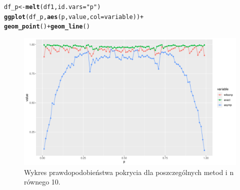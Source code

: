 \documentclass[12pt]{mwart}\usepackage[]{graphicx}\usepackage[]{color}
\makeatletter
\def\maxwidth{ %
  \ifdim\Gin@nat@width>\linewidth
    \linewidth
  \else
    \Gin@nat@width
  \fi
}
\newcommand{\hlstr}[1]{\textcolor[rgb]{0.192,0.494,0.8}{#1}}%
\newcommand{\hlopt}[1]{\textcolor[rgb]{0,0,0}{#1}}%
\newcommand{\hlstd}[1]{\textcolor[rgb]{0.345,0.345,0.345}{#1}}%
\newcommand{\hlkwb}[1]{\textcolor[rgb]{0.69,0.353,0.396}{#1}}%
\newcommand{\hlkwc}[1]{\textcolor[rgb]{0.333,0.667,0.333}{#1}}%
\newcommand{\hlkwd}[1]{\textcolor[rgb]{0.737,0.353,0.396}{\textbf{#1}}}%
\newenvironment{kframe}{%
 \def\at@end@of@kframe{}%
 \ifinner\ifhmode%
  \def\at@end@of@kframe{\end{minipage}}%
  \begin{minipage}{\columnwidth}%
 \fi\fi%
 \def\FrameCommand##1{\hskip\@totalleftmargin \hskip-\fboxsep
 \colorbox{shadecolor}{##1}\hskip-\fboxsep
     \hskip-\linewidth \hskip-\@totalleftmargin \hskip\columnwidth}%
 \MakeFramed {\advance\hsize-\width
   \@totalleftmargin\z@ \linewidth\hsize
   \@setminipage}}%
 {\par\unskip\endMakeFramed%
 \at@end@of@kframe}
\newenvironment{knitrout}{}{} %
\makeatother
\begin{document}
\begin{knitrout}
\color{fgcolor}\begin{kframe}
\begin{alltt}
\hlstd{df_p} \hlkwb{<-} \hlkwd{melt}\hlstd{(df1,}\hlkwc{id.vars}\hlstd{=}\hlstr{"p"}\hlstd{)}
\hlkwd{ggplot}\hlstd{(df_p,}\hlkwd{aes}\hlstd{(p, value,}\hlkwc{col}\hlstd{=variable))}\hlopt{+}
  \hlkwd{geom_point}\hlstd{()}\hlopt{+} \hlkwd{geom_line}\hlstd{()}
\end{alltt}
\end{kframe}\begin{figure}[H]
\includegraphics[width=\maxwidth]{figure/fig_6-1} \caption{\label{fig:6}Wykres prawdopodobieństwa pokrycia dla poszczególnych metod i n równego 10.}\label{fig:fig_6}
\end{figure}

\end{knitrout}
\end{document}
